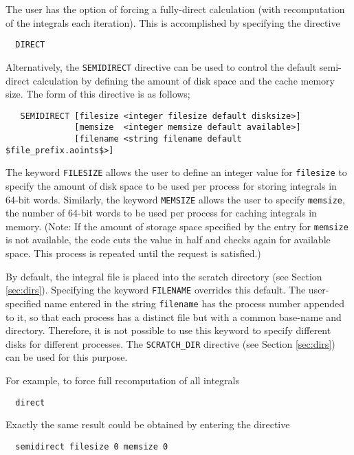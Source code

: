 The user has the option of forcing a fully-direct calculation (with
recomputation of the integrals each iteration).  This is accomplished
by specifying the directive

\begin{verbatim}
  DIRECT
\end{verbatim}

Alternatively, the \verb+SEMIDIRECT+ directive can be used to control
the default semi-direct calculation by defining the amount of disk
space and the cache memory size.  The form of this directive is as
follows;

\begin{verbatim}
   SEMIDIRECT [filesize <integer filesize default disksize>] 
              [memsize  <integer memsize default available>]
              [filename <string filename default $file_prefix.aoints$>]
\end{verbatim}

The keyword \verb+FILESIZE+ allows the user to define an integer value
for \verb+filesize+ to specify the amount of disk space to be used per
process for storing integrals in 64-bit words.  Similarly, the keyword
\verb+MEMSIZE+ allows the user to specify \verb+memsize+, the number
of 64-bit words to be used per process for caching integrals in
memory. (Note: If the amount of storage space specified by the entry
for \verb+memsize+ is not available, the code cuts the value in half
and checks again for available space.  This process is repeated until
the request is satisfied.)  

By default, the integral file is placed into the scratch directory
(see Section \ref{sec:dirs}). Specifying the keyword \verb+FILENAME+
overrides this default.  The user-specified name entered in the string
\verb+filename+ has the process number appended to it, so that each
process has a distinct file but with a common base-name and directory.
Therefore, it is not possible to use this keyword to specify different
disks for different processes.  The \verb+SCRATCH_DIR+ directive (see
Section \ref{sec:dirs}) can be used for this purpose.

For example, to force full recomputation of all integrals
\begin{verbatim}
  direct
\end{verbatim}

Exactly the same result could be obtained by entering the directive
\begin{verbatim}
  semidirect filesize 0 memsize 0
\end{verbatim}

